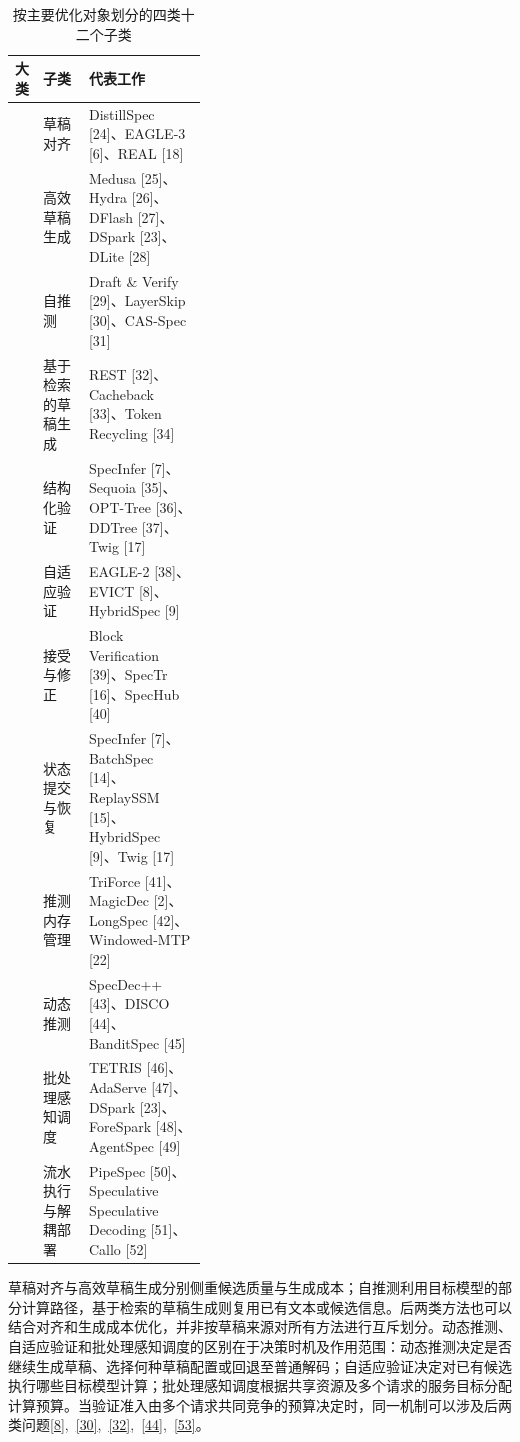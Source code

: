 \documentclass[11pt,a4paper,UTF8,fontset=none,scheme=plain,zihao=-4]{ctexart}
\begin{document}
\begin{table}[!tbp]
\centering
\footnotesize
\setlength{\tabcolsep}{3pt}
\renewcommand{\arraystretch}{1.22}
\caption{按主要优化对象划分的四类十二个子类}\label{tbl-taxonomy}
\begin{tabularx}{\linewidth}{@{}>{\raggedright\arraybackslash}p{0.14\linewidth}>{\raggedright\arraybackslash}p{0.24\linewidth}>{\raggedright\arraybackslash}X@{}}
\toprule
\textbf{大类} & \textbf{子类} & \textbf{代表工作} \\
\midrule
\multirow[t]{4}{=}{\bfseries 草稿生成优化} & 草稿对齐 & DistillSpec [24]、EAGLE-3 [6]、REAL [18] \\
 & 高效草稿生成 & Medusa [25]、Hydra [26]、DFlash [27]、DSpark [23]、DLite [28] \\
 & 自推测 & Draft \& Verify [29]、LayerSkip [30]、CAS-Spec [31] \\
 & 基于检索的草稿生成 & REST [32]、Cacheback [33]、Token Recycling [34] \\
\addlinespace[4pt]
\multirow[t]{3}{=}{\bfseries 验证优化} & 结构化验证 & SpecInfer [7]、Sequoia [35]、OPT-Tree [36]、DDTree [37]、Twig [17] \\
 & 自适应验证 & EAGLE-2 [38]、EVICT [8]、HybridSpec [9] \\
 & 接受与修正 & Block Verification [39]、SpecTr [16]、SpecHub [40] \\
\addlinespace[4pt]
\multirow[t]{2}{=}{\bfseries 状态与内存管理} & 状态提交与恢复 & SpecInfer [7]、BatchSpec [14]、ReplaySSM [15]、HybridSpec [9]、Twig [17] \\
 & 推测内存管理 & TriForce [41]、MagicDec [2]、LongSpec [42]、Windowed-MTP [22] \\
\addlinespace[4pt]
\multirow[t]{3}{=}{\bfseries 系统级优化} & 动态推测 & SpecDec++ [43]、DISCO [44]、BanditSpec [45] \\
 & 批处理感知调度 & TETRIS [46]、AdaServe [47]、DSpark [23]、ForeSpark [48]、AgentSpec [49] \\
 & 流水执行与解耦部署 & PipeSpec [50]、Speculative Speculative Decoding [51]、Callo [52] \\
\bottomrule
\end{tabularx}
\end{table}

草稿对齐与高效草稿生成分别侧重候选质量与生成成本；自推测利用目标模型的部分计算路径，基于检索的草稿生成则复用已有文本或候选信息。后两类方法也可以结合对齐和生成成本优化，并非按草稿来源对所有方法进行互斥划分。动态推测、自适应验证和批处理感知调度的区别在于决策时机及作用范围：动态推测决定是否继续生成草稿、选择何种草稿配置或回退至普通解码；自适应验证决定对已有候选执行哪些目标模型计算；批处理感知调度根据共享资源及多个请求的服务目标分配计算预算。当验证准入由多个请求共同竞争的预算决定时，同一机制可以涉及后两类问题\protect\hyperlink{ref-evict}{{[}8{]}},~\protect\hyperlink{ref-layerskip}{{[}30{]}},~\protect\hyperlink{ref-rest}{{[}32{]}},~\protect\hyperlink{ref-disco}{{[}44{]}},~\protect\hyperlink{ref-avdocs}{{[}53{]}}。
\end{document}
